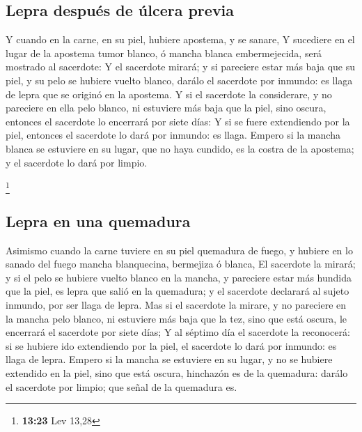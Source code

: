\hypertarget{lepra-despuuxe9s-de-uxfalcera-previa}{%
\subsection{Lepra después de úlcera
previa}\label{lepra-despuuxe9s-de-uxfalcera-previa}}

 Y cuando en la carne, en su piel, hubiere apostema, y se
sanare,  Y sucediere en el lugar de la apostema tumor
blanco, ó mancha blanca embermejecida, será mostrado al sacerdote:
 Y el sacerdote mirará; y si pareciere estar más baja que
su piel, y su pelo se hubiere vuelto blanco, darálo el sacerdote por
inmundo: es llaga de lepra que se originó en la apostema.
 Y si el sacerdote la considerare, y no pareciere en ella
pelo blanco, ni estuviere más baja que la piel, sino oscura, entonces el
sacerdote lo encerrará por siete días:  Y si se fuere
extendiendo por la piel, entonces el sacerdote lo dará por inmundo: es
llaga.  Empero si la mancha blanca se estuviere en su
lugar, que no haya cundido, es la costra de la apostema; y el sacerdote
lo dará por limpio.

\footnote{\textbf{13:23} Lev 13,28}

\hypertarget{lepra-en-una-quemadura}{%
\subsection{Lepra en una quemadura}\label{lepra-en-una-quemadura}}

 Asimismo cuando la carne tuviere en su piel quemadura de
fuego, y hubiere en lo sanado del fuego mancha blanquecina, bermejiza ó
blanca,  El sacerdote la mirará; y si el pelo se hubiere
vuelto blanco en la mancha, y pareciere estar más hundida que la piel,
es lepra que salió en la quemadura; y el sacerdote declarará al sujeto
inmundo, por ser llaga de lepra.  Mas si el sacerdote la
mirare, y no pareciere en la mancha pelo blanco, ni estuviere más baja
que la tez, sino que está oscura, le encerrará el sacerdote por siete
días;  Y al séptimo día el sacerdote la reconocerá: si se
hubiere ido extendiendo por la piel, el sacerdote lo dará por inmundo:
es llaga de lepra.  Empero si la mancha se estuviere en
su lugar, y no se hubiere extendido en la piel, sino que está oscura,
hinchazón es de la quemadura: darálo el sacerdote por limpio; que señal
de la quemadura es.

